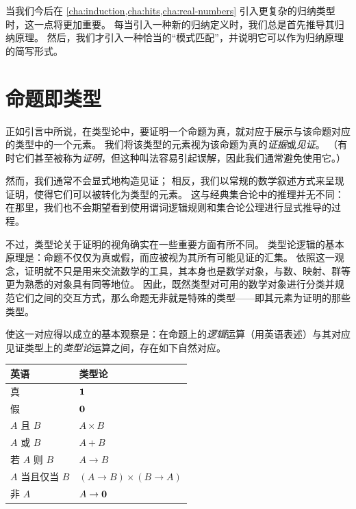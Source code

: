 当我们今后在 \cref{cha:induction,cha:hits,cha:real-numbers} 引入更复杂的归纳类型时，这一点将更加重要。
每当引入一种新的归纳定义时，我们总是首先推导其归纳原理。
然后，我们才引入一种恰当的``模式匹配''，并说明它可以作为归纳原理的简写形式。

%
%

\section{命题即类型}
\label{sec:pat}

%
%
正如引言中所说，在类型论中，要证明一个命题为真，就对应于展示与该命题对应的类型中的一个元素。
%
%
我们将该类型的元素视为该命题为真的\emph{证据}或\emph{见证}。
（有时它们甚至被称为\emph{证明}，但这种叫法容易引起误解，因此我们通常避免使用它。）

然而，我们通常不会显式地构造见证；
相反，我们以常规的数学叙述方式来呈现证明，使得它们可以被转化为类型的元素。
这与经典集合论中的推理并无不同：在那里，我们也不会期望看到使用谓词逻辑规则和集合论公理进行显式推导的过程。

不过，类型论关于证明的视角确实在一些重要方面有所不同。
类型论逻辑的基本原理是：命题不仅仅为真或假，而应被视为其所有可能见证的汇集。
依照这一观念，证明就不只是用来交流数学的工具，其本身也是数学对象，与数、映射、群等更为熟悉的对象具有同等地位。
因此，既然类型对可用的数学对象进行分类并规范它们之间的交互方式，那么命题无非就是特殊的类型——即其元素为证明的那些类型。

%
%
使这一对应得以成立的基本观察是：在命题上的\emph{逻辑}运算（用英语表述）与其对应见证类型上的\emph{类型论}运算之间，存在如下自然对应。
%
%
%
%
%

\begin{center}
\medskip
\begin{tabular}{ll}
  \toprule
  英语 & 类型论\\
  \midrule
  真 & $\mathbf{1}$ \\
  假 & $\mathbf{0}$ \\
  $A$ 且 $B$ & $A \times B$ \\
  $A$ 或 $B$ & $A + B$ \\
  若 $A$ 则 $B$ & $A \to B$ \\
  $A$ 当且仅当 $B$ & $(A \to B) \times (B \to A)$ \\
  非 $A$ &  $A \to \mathbf{0}$ \\
  \bottomrule
\end{tabular}
\medskip
\end{center}

